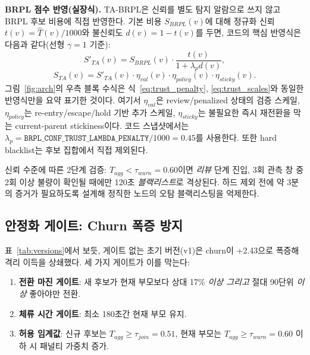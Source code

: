 \documentclass[12pt,a4paper]{article}
\begin{document}
\medskip
\noindent\textbf{BRPL 점수 반영(실장식).}
TA-BRPL은 신뢰를 별도 탐지 알람으로 쓰지 않고
BRPL 후보 비용에 직접 반영한다.
기본 비용 $S_{BRPL}(v)$에 대해 정규화 신뢰
$t(v)=\hat{T}(v)/1000$와 불신뢰도 $d(v)=1-t(v)$를 두면,
코드의 핵심 반영식은 다음과 같다(선형 $\gamma=1$ 기준):
\begin{equation}
  S'_{TA}(v)=
  S_{BRPL}(v)\cdot
  \frac{t(v)}{1+\lambda_p d(v)},
  \label{eq:trust_penalty}
\end{equation}
\begin{equation}
  S_{TA}(v)=
  S'_{TA}(v)\cdot
  \eta_{val}(v)\cdot
  \eta_{policy}(v)\cdot
  \eta_{sticky}(v).
  \label{eq:trust_scales}
\end{equation}
그림~\ref{fig:arch}의 우측 블록 수식은 식~\eqref{eq:trust_penalty},
\eqref{eq:trust_scales}와 동일한 반영식만을 요약 표기한 것이다.
여기서 $\eta_{val}$은 review/penalized 상태의 검증 스케일,
$\eta_{policy}$는 re-entry/escape/hold 기반 추가 스케일,
$\eta_{sticky}$는 불필요한 즉시 재전환을 막는 current-parent stickiness이다.
코드 스냅샷에서는 $\lambda_p = \texttt{BRPL\_CONF\_TRUST\_LAMBDA\_PENALTY}/1000 = 0.45$를 사용한다.
또한 hard blacklist는 후보 집합에서 직접 제외된다.

신뢰 수준에 따른 2단계 검증:
$T_{agg} < \tau_{warn}=0.60$이면 \emph{리뷰} 단계 진입,
3회 관측 창 중 2회 이상 불량이 확인될 때에만
120초 \emph{블랙리스트}로 격상된다.
하드 제외 전에 약 3분의 증거가 필요하도록 설계해
정직한 노드의 오탐 블랙리스팅을 억제한다.

\subsection{안정화 게이트: Churn 폭증 방지}

표~\ref{tab:versions}에서 보듯, 게이트 없는 초기 버전(v1)은
churn이 +2.43으로 폭증해 격리 이득을 상쇄했다.
세 가지 게이트가 이를 막는다:

\begin{enumerate}[(1)]
  \item \textbf{전환 마진 게이트}: 새 후보가 현재 부모보다
    상대 17\% \emph{이상 그리고} 절대 90단위 \emph{이상} 좋아야만 전환.
  \item \textbf{체류 시간 게이트}: 최소 180초간 현재 부모 유지.
  \item \textbf{허용 임계값}: 신규 후보는 $T_{agg}\ge\tau_{join}=0.51$,
    현재 부모는 $T_{agg}\ge\tau_{warn}=0.60$ 이하 시 패널티 가중치 증가.
\end{enumerate}
\end{document}
